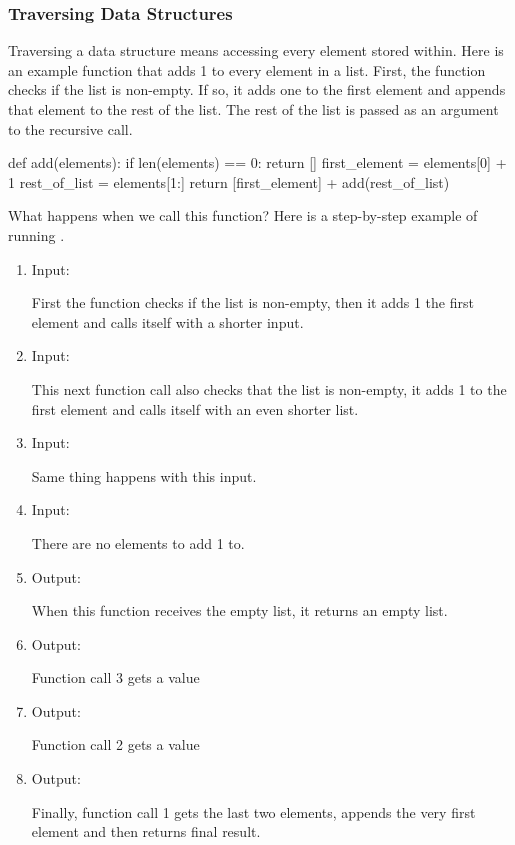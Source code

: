 \documentclass[11pt]{cselabheader}
\begin{document}
\subsubsection{Traversing Data Structures}
Traversing a data structure means accessing every element stored within.
Here is an example function that adds 1 to every element in a list.
First, the function checks if the list is non-empty. If so, it adds
one to the first element and appends that element to the rest of
the list. The rest of the list is passed as an argument to the
recursive call.

\begin{python3code}
def add(elements):
    if len(elements) == 0:
        return []
    first_element = elements[0] + 1
    rest_of_list = elements[1:]
    return [first_element] + add(rest_of_list)
\end{python3code}

What happens when we call this function? Here is a step-by-step
example of running .

\begin{enumerate}
\item Input: \pythoninline{[1, 2, 3]}

First the function checks if the list is non-empty, then it adds 1 the
first element and calls itself with a shorter input.
\item Input: \pythoninline{[2, 3]}

This next function call also checks that the list is non-empty, it adds 1
to the first element and calls itself with an even shorter list.
\item Input: \pythoninline{[3]}

Same thing happens with this input.
\item Input: \pythoninline{[]}

There are no elements to add 1 to.
\item Output: \pythoninline{[]}

When this function receives the empty list, it returns an empty list.
\item Output: \pythoninline{[3 + 1] + []}

Function call 3 gets a value
\item Output: \pythoninline{[2 + 1] + [3 + 1] + []}

Function call 2 gets a value
\item Output: \pythoninline{[3 + 1] + [2 + 1] + [3 + 1] + []}

Finally, function call 1 gets the last two elements, appends the very
first element and then returns final result.
\end{enumerate}
\end{document}
